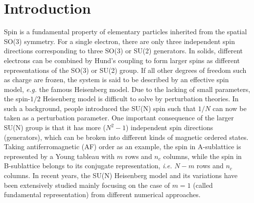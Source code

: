 \documentclass[aps,twocolumn,superscriptaddress]{revtex4-1}
\newcommand{\ie}{\textit{i.e.{ }}}
\newcommand{\eg}{\textit{e.g.{ }}}
\begin{document}
\section{Introduction}
Spin is a fundamental property of elementary particles inherited from the spatial SO(3) symmetry. For a single electron, there are only three independent spin directions corresponding to three SO(3) or SU(2) generators. In solids, different electrons can be combined by Hund's coupling to form larger spins as different representations of the SO(3) or SU(2) group. If all other degrees of freedom such as charge are frozen, the system is said to be described by an effective spin model, \eg the famous Heisenberg model. Due to the lacking of small parameters, the spin-$1/2$ Heisenberg model is difficult to solve by perturbation theories. In such a background, people introduced the SU(N) spin such that $1/N$ can now be taken as a perturbation parameter. \cite{affleck1985,affleck1988,*marston1989,arovas1988,read1989,*read1989a,*read1990} One important consequence of the larger SU(N) group is that it has more ($N^2-1$) independent spin directions (generators), which can be broken into different kinds of magnetic ordered states. Taking antiferromagnetic (AF) order as an example, the spin in A-sublattice is represented by a Young tableau with $m$ rows and $n_c$ columns, while the spin in B-sublattice belongs to its conjugate representation, \ie $N-m$ rows and $n_c$ columns. In recent years, the SU(N) Heisenberg model and its variations have been extensively studied mainly focusing on the case of $m=1$ (called fundamental representation) from different numerical approaches. \cite{harada2003,buchta2007,kawashima2007,arovas2008,beach2009,lou2009,rachel2009,kaul2012,harada2013,nataf2014,okubo2015,suzuki2015,nataf2016}
\end{document}
